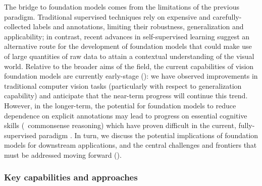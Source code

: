 The bridge to foundation models comes from the limitations of the previous paradigm. Traditional supervised techniques rely on expensive and carefully-collected labels and annotations, limiting their robustness, generalization and applicability; in contrast, recent advances in self-supervised learning \cite{chen2020simclr, He2020MomentumCF}
suggest an alternative route for the development of foundation models that could make use of large quantities of raw data to attain a contextual understanding of the visual world. Relative to the broader aims of the field, the current capabilities of vision foundation models are currently early-stage (): we have observed improvements in traditional computer vision tasks (particularly with respect to generalization capability) \cite{radford2021learning,ramesh2021zeroshot} and anticipate that the near-term progress will continue this trend. However, in the longer-term, the potential for foundation models to reduce dependence on explicit annotations may lead to progress on essential cognitive skills (\eg~commonsense reasoning) which have proven difficult in the current, fully-supervised paradigm \cite{zellers2019vcr,martin2021jrdb}.
In turn, we discuss the potential implications of foundation models for downstream applications, and the central challenges and frontiers that must be addressed moving forward ().


\subsubsection{Key capabilities and approaches}
\label{sec:vision-capabilities}


